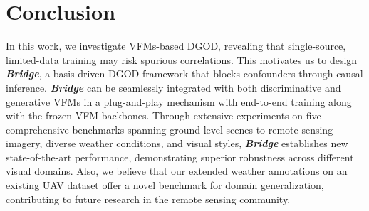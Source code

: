 \section{Conclusion}
\label{sec:conclusion}
In this work, we investigate VFMs-based DGOD, revealing that single-source, limited-data training may risk spurious correlations. This motivates us to design \textbf{\textit{Bridge}}, a basis-driven DGOD framework that blocks confounders through causal inference. 
\textbf{\textit{Bridge}} can be seamlessly integrated with both discriminative and generative VFMs in a plug-and-play mechanism with end-to-end training along with the frozen VFM backbones.
Through extensive experiments on five comprehensive benchmarks spanning ground-level scenes to remote sensing imagery, diverse weather conditions, and visual styles, \textbf{\textit{Bridge}} establishes new state-of-the-art performance, demonstrating superior robustness across different visual domains. 
Also, we believe that our extended weather annotations on an existing UAV dataset offer a novel benchmark for domain generalization, contributing to future research in the remote sensing community.

